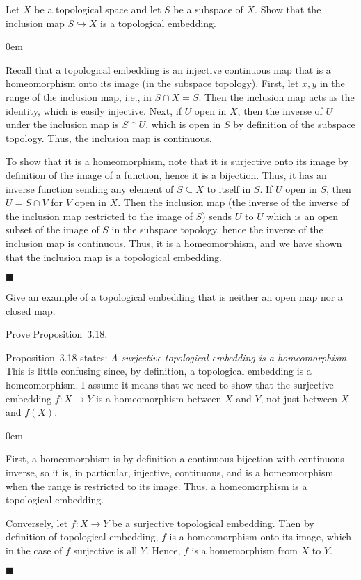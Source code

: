 \documentclass[12pt]{article}
\renewcommand{\qed}{\hfill$\blacksquare$}
\renewenvironment{proof}{\begin{addmargin}[1em]{0em}\begin{newproof}}{\end{newproof}\end{addmargin}\qed}
\newenvironment{exercise}[2][Exercise]{\begin{trivlist}
\item[\hskip \labelsep {\bfseries #1}\hskip \labelsep {\bfseries #2.}]}{\end{trivlist}}
\begin{document}
\begin{exercise}{3.13}
Let $X$ be a topological space and let $S$ be a subspace of $X$. Show that the inclusion map $S\hookrightarrow X$ is a topological embedding.
\end{exercise}
\begin{proof}
Recall that a topological embedding is an injective continuous map that is a homeomorphism onto its image (in the subspace topology). First, let $x,y$ in the range of the inclusion map, i.e., in $S\cap X = S$. Then the inclusion map acts as the identity, which is easily injective. Next, if $U$ open in $X$, then the inverse of $U$ under the inclusion map is $S\cap U$, which is open in $S$ by definition of the subspace topology. Thus, the inclusion map is continuous.

To show that it is a homeomorphism, note that it is surjective onto its image by definition of the image of a function, hence it is a bijection. Thus, it has an inverse function sending any element of $S\subseteq X$ to itself in $S$. If $U$ open in $S$, then $U=S\cap V$ for $V$ open in $X$. Then the inclusion map (the inverse of the inverse of the inclusion map restricted to the image of $S$) sends $U$ to $U$ which is an open subset of the image of $S$ in the subspace topology, hence the inverse of the inclusion map is continuous. Thus, it is a homeomorphism, and we have shown that the inclusion map is a topological embedding.
\end{proof}





\begin{exercise}{3.17}
Give an example of a topological embedding that is neither an open map nor a closed map.
\end{exercise}

\begin{exercise}{3.19}
Prove Proposition~3.18.
\end{exercise}
Proposition~3.18 states:
\textit{ A surjective topological embedding is a homeomorphism.} \\
{\color{red} This is little confusing since, by definition, a topological embedding is a homeomorphism. I assume it means that we need to show that the surjective embedding $f:X\rightarrow Y$ is a homeomorphism between $X$ and $Y$, not just between $X$ and $f\left(X\right)$.} \\
\begin{proof}
First, a homeomorphism is by definition a continuous bijection with continuous inverse, so it is, in particular, injective, continuous, and is a homeomorphism when the range is restricted to its image. Thus, a homeomorphism is a topological embedding.

Conversely, let $f:X\rightarrow Y$ be a surjective topological embedding. Then by definition of topological embedding, $f$ is a homeomorphism onto its image, which in the case of $f$ surjective is all $Y$. Hence, $f$ is a homemorphism from $X$ to $Y$.
\end{proof}
\end{document}
